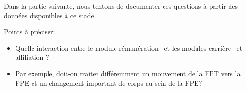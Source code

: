 \documentclass[11pt,a4paper]{article}
\begin{document}
Dans la partie suivante, nous tentons de documenter ces questions à partir des données disponibles à ce stade. 


\vspace{0.5cm}
Points à préciser: 
\begin{itemize}[leftmargin=1cm ,parsep=0cm,itemsep=0cm,topsep=0cm] 
    \item Quelle interaction entre le module \og rémunération \fg\ et les modules \og carrière \fg\ et \og affiliation \fg ?   
    \item[] Par exemple, doit-on traiter différemment un mouvement de la FPT vers la FPE et un changement important de corps au sein de la FPE? 
\end{itemize}



\ifx\isEmbedded\undefined
\newpage
 

\end{document}
